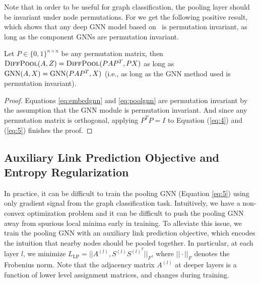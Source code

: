 
Note that in order to be useful for graph classification, the pooling layer should be invariant under node permutations. For \name we get the following positive result, which shows that any deep GNN model based on \name\ is permutation invariant, as long as the component GNNs are permutation invariant. 
\begin{proposition}
\label{prop:permute}
Let $P\in \{0,1\}^{n\times n}$ be any permutation matrix, then $\text{\sc \textsc{DiffPool}}(A, Z) = \text{\sc \textsc{DiffPool}}(PAP^T,PX)$ as long as $\textrm{GNN}(A, X) = \textrm{GNN}(PAP^T, X)$ (i.e., as long as the GNN method used is permutation invariant).
\end{proposition}
\begin{proof}
Equations \eqref{eq:embedgnn} and \eqref{eq:poolgnn} are permutation invariant by the assumption that the GNN module is permutation invariant. 
And since any permutation matrix is orthogonal, applying $P^T P=I$ to Equation (\ref{eq:4}) and (\ref{eq:5}) finishes the proof.
\end{proof}


\subsection{Auxiliary Link Prediction Objective and Entropy Regularization}

In practice, it can be difficult to train the pooling GNN (Equation \ref{eq:5}) using only gradient signal from the graph classification task.
Intuitively, we have a non-convex optimization problem and it can be difficult to push the pooling GNN away from spurious local minima early in training.
To alleviate this issue, we train the pooling GNN with an auxiliary link prediction objective, which encodes the intuition that nearby nodes should be pooled together. 
In particular, at each layer $l$, we minimize
$L_{\text{LP}} = ||A^{(l)}, S^{(l)} S^{{(l)}^T}||_F$, where $||\cdot||_F$ denotes the Frobenius norm. 
Note that the adjacency matrix $A^{(l)}$ at deeper layers is a function of lower level assignment matrices, and changes during training. 

